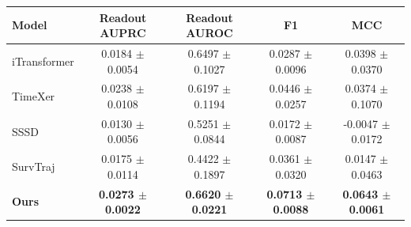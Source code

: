 \begin{tabular}{lcccc}
\toprule
\textbf{Model} & \textbf{Readout AUPRC} & \textbf{Readout AUROC} & \textbf{F1} & \textbf{MCC} \\
\midrule
iTransformer & 0.0184 $\pm$ 0.0054 & 0.6497 $\pm$ 0.1027 & 0.0287 $\pm$ 0.0096 & 0.0398 $\pm$ 0.0370 \\
TimeXer & 0.0238 $\pm$ 0.0108 & 0.6197 $\pm$ 0.1194 & 0.0446 $\pm$ 0.0257 & 0.0374 $\pm$ 0.1070 \\
SSSD & 0.0130 $\pm$ 0.0056 & 0.5251 $\pm$ 0.0844 & 0.0172 $\pm$ 0.0087 & -0.0047 $\pm$ 0.0172 \\
SurvTraj & 0.0175 $\pm$ 0.0114 & 0.4422 $\pm$ 0.1897 & 0.0361 $\pm$ 0.0320 & 0.0147 $\pm$ 0.0463 \\
\midrule
\textbf{Ours} & \textbf{0.0273 $\pm$ 0.0022} & \textbf{0.6620 $\pm$ 0.0221} & \textbf{0.0713 $\pm$ 0.0088} & \textbf{0.0643 $\pm$ 0.0061} \\
\bottomrule
\end{tabular}
